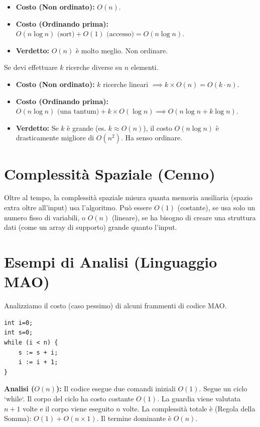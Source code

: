 \begin{example}
\begin{itemize}
    \item \textbf{Costo (Non ordinato):} $O(n)$.
    \item \textbf{Costo (Ordinando prima):} $O(n \log n) \text{ (sort)} + O(1) \text{ (accesso)} = O(n \log n)$.
    \item \textbf{Verdetto:} $O(n)$ è molto meglio. Non ordinare.
\end{itemize}
\end{example}

\begin{example}
Se devi effettuare $k$ ricerche diverse su $n$ elementi.
\begin{itemize}
    \item \textbf{Costo (Non ordinato):} $k$ ricerche lineari $\implies k \times O(n) = O(k \cdot n)$.
    \item \textbf{Costo (Ordinando prima):} $O(n \log n) \text{ (una tantum)} + k \times O(\log n) \implies O(n \log n + k \log n)$.
    \item \textbf{Verdetto:} Se $k$ è grande (es. $k \approx O(n)$), il costo $O(n \log n)$ è drasticamente migliore di $O(n^2)$. Ha senso ordinare.
\end{itemize}
\end{example}

\section{Complessità Spaziale (Cenno)}
Oltre al tempo, la complessità spaziale misura quanta memoria ausiliaria (spazio extra oltre all'input) usa l'algoritmo. Può essere $O(1)$ (costante), se usa solo un numero fisso di variabili, o $O(n)$ (lineare), se ha bisogno di creare una struttura dati (come un array di supporto) grande quanto l'input.

\section{Esempi di Analisi (Linguaggio MAO)}
Analizziamo il costo (caso pessimo) di alcuni frammenti di codice MAO.


\begin{example}
\begin{lstlisting}[language={}, basicstyle=\ttfamily\bfseries, backgroundcolor=\color{codegray}, frame=tb, numbers=none, breaklines=true, tabsize=2]
int i=0;
int s=0;
while (i < n) {
    s := s + i;
    i := i + 1;
}
\end{lstlisting}
\textbf{Analisi ($O(n)$):} Il codice esegue due comandi iniziali $O(1)$. Segue un ciclo `while`. Il corpo del ciclo ha costo costante $O(1)$. La guardia viene valutata $n+1$ volte e il corpo viene eseguito $n$ volte.
La complessità totale è (Regola della Somma): $O(1) + O(n \times 1)$. Il termine dominante è $O(n)$.
\end{example}

